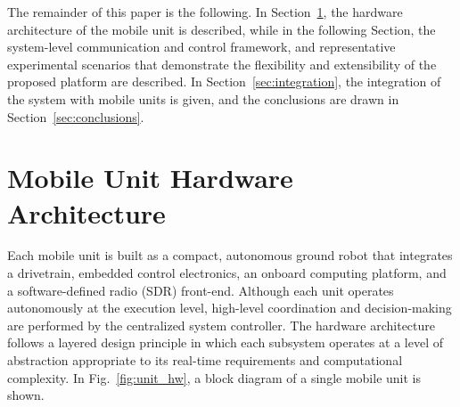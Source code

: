\documentclass[conference,a4paper]{IEEEtran}
\begin{document}
The remainder of this paper is the following. In Section~\ref{sec:unit_architecture}, the hardware architecture of the mobile unit is described, while in the following Section, the system-level communication and control framework, and representative experimental scenarios that demonstrate the flexibility and extensibility of the proposed platform are described. In Section~\ref{sec:integration}, the integration of the system with mobile units is given, and the conclusions are drawn in Section~\ref{sec:conclusions}.  
\section{Mobile Unit Hardware Architecture}
\label{sec:unit_architecture}


Each mobile unit is built as a compact, autonomous ground robot that integrates a drivetrain, embedded control electronics, an onboard computing platform, and a software-defined radio (SDR) front-end. Although each unit operates autonomously at the execution level, high-level coordination and decision-making are performed by the centralized system controller. The hardware architecture follows a layered design principle in which each subsystem operates at a level of abstraction appropriate to its real-time requirements and computational complexity. In Fig.~\ref{fig:unit_hw}, a block diagram of a single mobile unit is shown.


\end{document}
